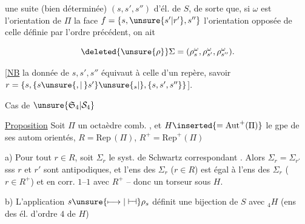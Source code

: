 


une suite (bien déterminée) $(s,s',s'')$ d'él.  de $S$, de sorte que, si $\omega$ est l'orientation de $\Pi$   la face $f=\{s,\unsure{s'|r'},s''\}$ l'orientation opposée de celle définie par l'ordre précédent, on ait

\[
\deleted{\unsure{\rho}}\Sigma=(\rho_s^\omega,\rho_{s'}^\omega,\rho_{s''}^\omega).
\]

[\uline{NB} la donnée de $s,s',s''$ équivaut à celle d'un repère, savoir $r=\{s,\{s\unsure{,|\mathord{\,}}s'\}\unsure{_s|{}},\{s,s',s''\}\}$].


Cas de $\unsure{\mathfrak S_4|\mathcal S_4}$

\uline{Proposition} Soit $\Pi$ un octaèdre comb. , et $H\inserted{=\mathrm{Aut}^{+}(\Pi)}$ le gpe de ses autom orientés, $R=\mathrm{Rep}\,(\Pi)$, $R^{+}=\mathrm{Rep}^{+}(\Pi)$

a) Pour tout $r\in R$, soit $\Sigma_r$ le syst. de Schwartz correspondant . Alors $\Sigma_r=\Sigma_{r'}$ sss $r$ et $r'$ sont antipodiques, et l'ens des $\Sigma_r$ ($r\in R$) est égal à l'ens des $\Sigma_r$ ($r\in R^{+}$) et en corr. $1$--$1$ avec $R^{+}$ -- donc un torseur sous $H$.


b) L'application $s\unsure{\longmapsto|\mathrel{\vdash\!\dashv}}\rho_s$ définit une bijection de $S$ avec $ {}_4H$ (ens des él. d'ordre $4$ de $H$)

